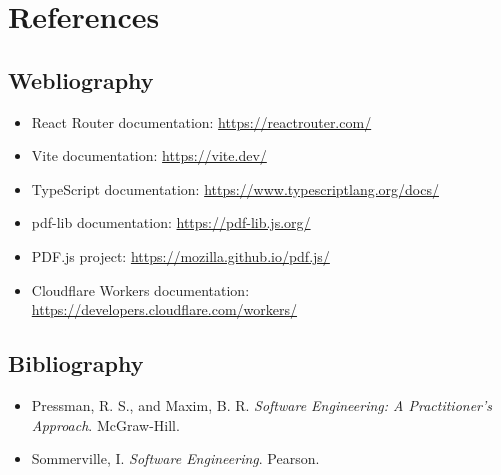 \section{References}

\subsection{Webliography}
\begin{itemize}
  \item React Router documentation: \url{https://reactrouter.com/}
  \item Vite documentation: \url{https://vite.dev/}
  \item TypeScript documentation: \url{https://www.typescriptlang.org/docs/}
  \item pdf-lib documentation: \url{https://pdf-lib.js.org/}
  \item PDF.js project: \url{https://mozilla.github.io/pdf.js/}
  \item Cloudflare Workers documentation: \url{https://developers.cloudflare.com/workers/}
\end{itemize}

\subsection{Bibliography}
\begin{itemize}
  \item Pressman, R. S., and Maxim, B. R. \textit{Software Engineering: A Practitioner's Approach}. McGraw-Hill.
  \item Sommerville, I. \textit{Software Engineering}. Pearson.
\end{itemize}
